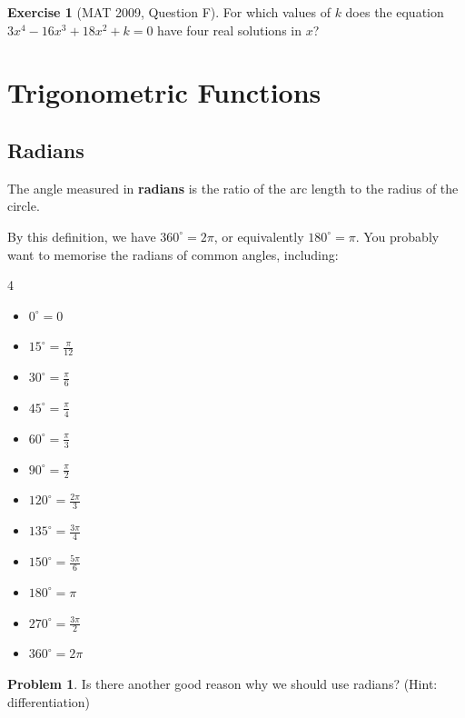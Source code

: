 \documentclass[11pt]{article}
\theoremstyle{definition}
\newtheorem{example}[theorem]{Exercise}
\newtheorem{problem}[theorem]{Problem}
\theoremstyle{remark}
\newcommand{\flatfrac}[2]{\frac{#1}{#2}}
\newcommand{\degree}{^{\circ}}
\begin{document}
\begin{example}[MAT 2009, Question F]\label{tmua-2-unit-014}
    For which values of \(k\) does the equation \(3 x^4 - 16 x^3 + 18 x^2 + k = 0\) have four real solutions in \(x\)?
\end{example}

\section{Trigonometric Functions}\label{tmua-2-section-002}
\subsection{Radians}\label{tmua-2-subsection-004}

The angle measured in \textbf{radians} is the ratio of the arc length to the radius of the circle.

By this definition, we have \(360 \degree = 2 \pi\), or equivalently \(180 \degree = \pi\). You probably want to memorise the radians of common angles, including:
\begin{multicols}{4}
    \begin{itemize}
        \item \(0 \degree = 0\)
        \item \(15 \degree = \flatfrac{\pi}{12}\)
        \item \(30 \degree = \flatfrac{\pi}{6}\)
        \item \(45 \degree = \flatfrac{\pi}{4}\)
        \item \(60 \degree = \flatfrac{\pi}{3}\)
        \item \(90 \degree = \flatfrac{\pi}{2}\)
        \item \(120 \degree = \flatfrac{2\pi}{3}\)
        \item \(135 \degree = \flatfrac{3\pi}{4}\)
        \item \(150 \degree = \flatfrac{5\pi}{6}\)
        \item \(180 \degree = \pi\)
        \item \(270 \degree = \flatfrac{3\pi}{2}\)
        \item \(360 \degree = 2 \pi\)
    \end{itemize}
\end{multicols}

\begin{problem}\label{tmua-2-unit-015}
    Is there another good reason why we should use radians? (Hint: differentiation)
\end{problem}
\end{document}
